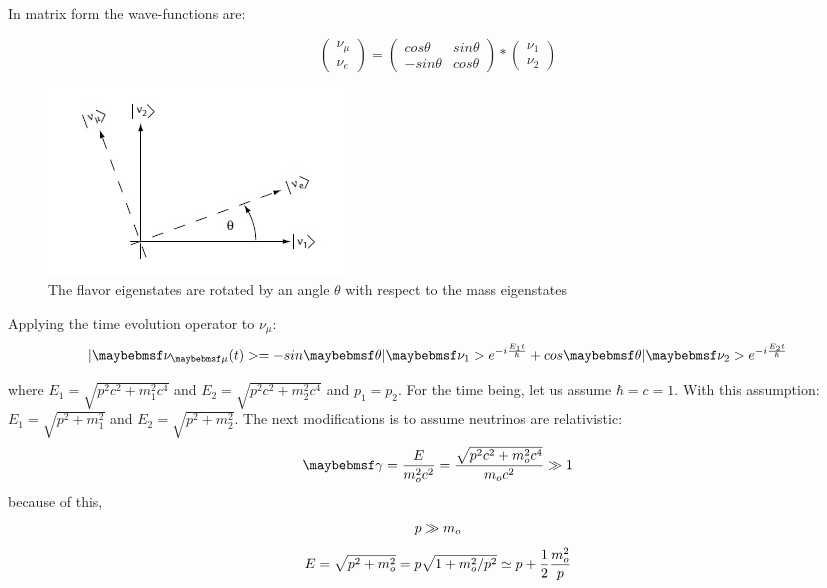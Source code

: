 In matrix form the wave-functions are:

\begin{equation}
\begin{pmatrix}
\nu_{\mu} \\
\nu_{e}
\end{pmatrix} 
 = \begin{pmatrix}
cos\theta & sin\theta \\
-sin\theta & cos\theta 
\end{pmatrix}*
\begin{pmatrix}
\nu_{1} \\
\nu_{2} 
\end{pmatrix}
\end{equation}


\begin{figure}[htp]
\centering
\includegraphics[scale=.8]{figs/mixingangle.jpg}
\caption{The flavor eigenstates are rotated by an angle $\theta$ with respect to the mass eigenstates}
\label{fig:mixing}
\end{figure}

Applying the time evolution operator to $\nu_{\mu}$:
\begin{equation}
\centering
\label{eq:timeevol}
|\nu_{\mu}(t)> = -sin\theta|\nu_{1}>e^{-i\frac{E_{1}t}{\hbar}} + cos\theta|\nu_{2}>e^{-i\frac{E_{2}t}{\hbar}}
\end{equation}

where $E_{1} = \sqrt{p^2 c^2 + m^2_{1} c^4}$ and $E_{2} = \sqrt{p^2 c^2 + m^2_{2} c^4}$ and $p_{1}=p_{2}$. For the time being, let us assume $\hbar=c=1$. 
With this assumption:
$E_{1}=\sqrt{p^2+m^2_{1}}$ and $E_{2} = \sqrt{p^2 + m^2_{2}}$.
The next modifications is to assume neutrinos are relativistic:
\begin{equation}
\centering
\label{eq:gamma}
\gamma = \frac{E}{m^2_{o} c^2} = \frac{\sqrt{p^2 c^2 + m^2_{o} c^4}}{m_{o} c^2} \gg 1
\end{equation}
because of this,
\begin{equation}
\centering
p \gg m_{o}
\end{equation}
\begin{equation}
\centering
E = \sqrt{p^2 + m^2_{o}}=p\sqrt{1+m^2_{o}/p^2}\simeq p + \frac{1}{2}\frac{m^2_{o}}{p}
\end{equation}

